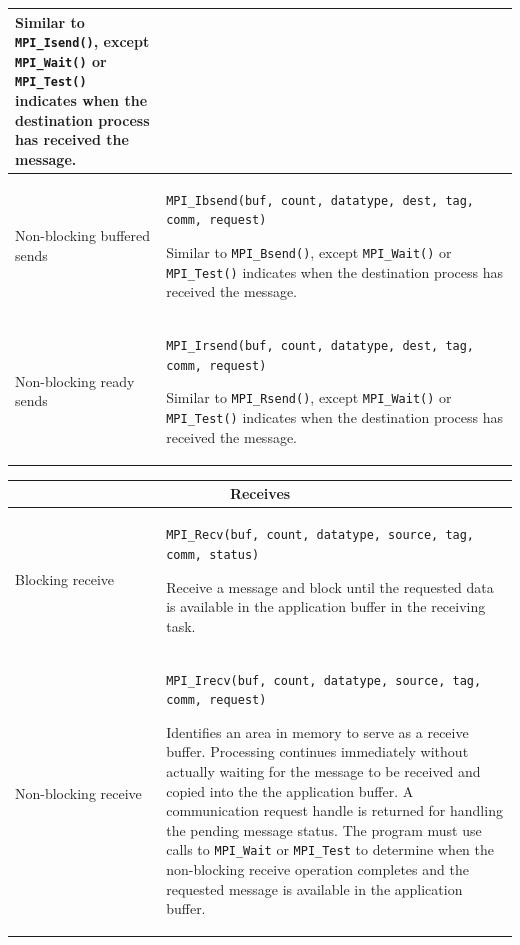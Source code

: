 \begin{tabular}{|p{0.3\linewidth}|p{0.75\linewidth}|}
Similar to \texttt{MPI\_Isend()}, except \texttt{MPI\_Wait()} or \texttt{MPI\_Test()} indicates when the destination process has received the message.   \\
\hline
Non-blocking buffered sends &  \texttt{MPI\_Ibsend(buf, count, datatype, dest, tag, comm, request)} 

Similar to \texttt{MPI\_Bsend()}, except \texttt{MPI\_Wait()} or \texttt{MPI\_Test()} indicates when the destination process has received the message.   \\
\hline
Non-blocking ready sends &  \texttt{MPI\_Irsend(buf, count, datatype, dest, tag, comm, request)} 

Similar to \texttt{MPI\_Rsend()}, except \texttt{MPI\_Wait()} or \texttt{MPI\_Test()} indicates when the destination process has received the message.   \\
\hline
\end{tabular}

\begin{tabular}{|p{0.3\linewidth}|p{0.75\linewidth}|}
\hline
\multicolumn{2}{|c|}{\textbf{Receives}} \\
\hline
Blocking receive & \texttt{MPI\_Recv(buf, count, datatype, source, tag, comm, status)} 

Receive a message and block until the requested data is available in the application buffer in the receiving task.  \\
\hline
Non-blocking receive & \texttt{MPI\_Irecv(buf, count, datatype, source, tag, comm, request)}

Identifies an area in memory to serve as a receive buffer. Processing continues immediately without actually  waiting  for  the  message  to  be  received  and  copied  into  the  the  application  buffer.  A communication request handle is returned for handling the pending message status. The program must  use  calls  to  \texttt{MPI\_Wait} or  \texttt{MPI\_Test}  to  determine  when  the  non-blocking  receive  operation completes and the requested message is available in the application buffer.  \\ 
\hline
\end{tabular}

